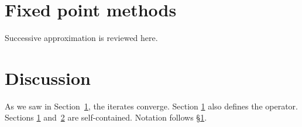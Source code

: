 \section{Fixed point methods}
\label{s:fps}

Successive approximation is reviewed here.

\section{Discussion}
\label{s:disc}

As we saw in Section~\ref{s:fps}, the iterates converge. Section
\ref{s:fps} also defines the operator. Sections \ref{s:fps}
and~\ref{s:disc} are self-contained. Notation follows
\S\ref{s:fps}.
